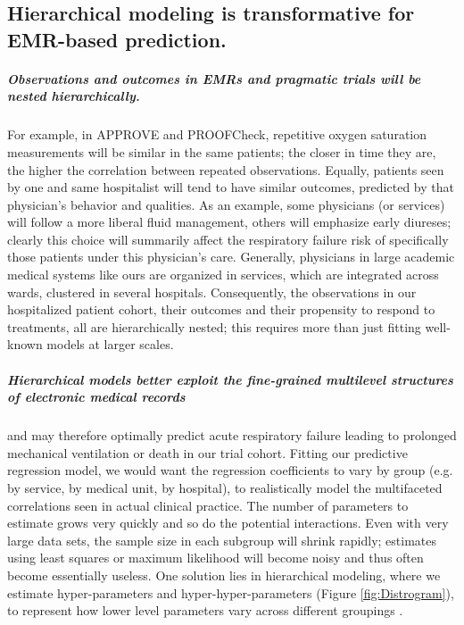 \documentclass[11pt,notitlepage]{article}
\begin{document}
\subsection*{Hierarchical modeling is transformative for EMR-based prediction.}

\subparagraph{Observations and outcomes in EMRs and pragmatic trials will be nested hierarchically.}
For example, in APPROVE and PROOFCheck, repetitive oxygen saturation measurements will be similar in the same patients; the closer in time they are, the higher the correlation between repeated observations. Equally, patients seen by one and same hospitalist will tend to have similar outcomes, predicted by that physician's behavior and qualities. As an example, some physicians (or services) will follow a more liberal fluid management, others will emphasize early diureses; clearly this choice will summarily affect the respiratory failure risk of specifically those patients under this physician's care. Generally, physicians in large academic medical systems like ours are organized in services, which are integrated across wards, clustered in several hospitals. Consequently, the observations in our hospitalized patient cohort, their outcomes and their propensity to respond to treatments, all are hierarchically nested; this requires more than just fitting well-known models at larger scales. 

\subparagraph*{Hierarchical models better exploit the fine-grained multilevel structures of electronic medical records} and may therefore optimally predict acute respiratory failure leading to prolonged mechanical ventilation or death in our trial cohort. Fitting our predictive regression model, we would want the regression coefficients to vary by group (e.g. by service, by medical unit, by hospital), to realistically model the multifaceted correlations seen in actual clinical practice. The number of parameters to estimate grows very quickly and so do the potential interactions. Even with very large data sets, the sample size in each subgroup will shrink rapidly; estimates using least squares or maximum likelihood will become noisy and thus often become essentially useless. One solution lies in hierarchical modeling, where we estimate hyper-parameters and hyper-hyper-parameters (Figure \ref{fig:Distrogram}), to represent how lower level parameters vary across different groupings \cite{Bafumi_Gelman_2007}. 
\end{document}
